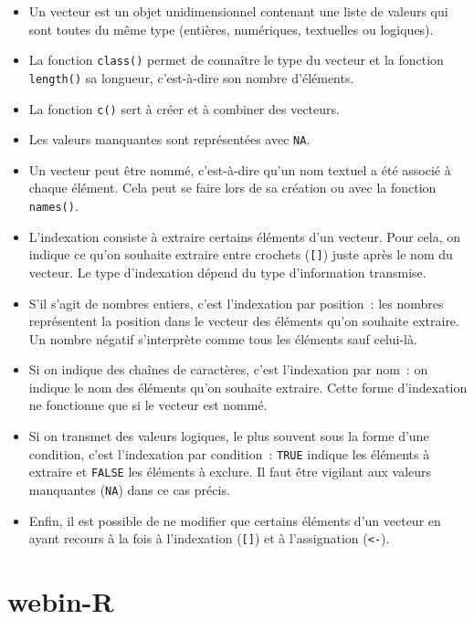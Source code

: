 \documentclass[
  letterpaper,
  DIV=11,
  numbers=noendperiod,
  oneside]{scrreprt}
\providecommand{\tightlist}{%
  \setlength{\itemsep}{0pt}\setlength{\parskip}{0pt}}\usepackage{longtable,booktabs,array}
\begin{document}
\begin{itemize}
\tightlist
\item
  Un vecteur est un objet unidimensionnel contenant une liste de valeurs
  qui sont toutes du même type (entières, numériques, textuelles ou
  logiques).
\item
  La fonction \texttt{class()} permet de connaître le type du vecteur et
  la fonction \texttt{length()} sa longueur, c'est-à-dire son nombre
  d'éléments.
\item
  La fonction \texttt{c()} sert à créer et à combiner des vecteurs.
\item
  Les valeurs manquantes sont représentées avec \texttt{NA}.
\item
  Un vecteur peut être nommé, c'est-à-dire qu'un nom textuel a été
  associé à chaque élément. Cela peut se faire lors de sa création ou
  avec la fonction \texttt{names()}.
\item
  L'indexation consiste à extraire certains éléments d'un vecteur. Pour
  cela, on indique ce qu'on souhaite extraire entre crochets
  (\texttt{{[}{]}}) juste après le nom du vecteur. Le type d'indexation
  dépend du type d'information transmise.
\item
  S'il s'agit de nombres entiers, c'est l'indexation par position~: les
  nombres représentent la position dans le vecteur des éléments qu'on
  souhaite extraire. Un nombre négatif s'interprète comme tous les
  éléments sauf celui-là.
\item
  Si on indique des chaînes de caractères, c'est l'indexation par nom~:
  on indique le nom des éléments qu'on souhaite extraire. Cette forme
  d'indexation ne fonctionne que si le vecteur est nommé.
\item
  Si on transmet des valeurs logiques, le plus souvent sous la forme
  d'une condition, c'est l'indexation par condition~: \texttt{TRUE}
  indique les éléments à extraire et \texttt{FALSE} les éléments à
  exclure. Il faut être vigilant aux valeurs manquantes (\texttt{NA})
  dans ce cas précis.
\item
  Enfin, il est possible de ne modifier que certains éléments d'un
  vecteur en ayant recours à la fois à l'indexation (\texttt{{[}{]}}) et
  à l'assignation (\texttt{\textless{}-}).
\end{itemize}

\hypertarget{webin-r}{%
\section{webin-R}\label{webin-r}}
\end{document}
